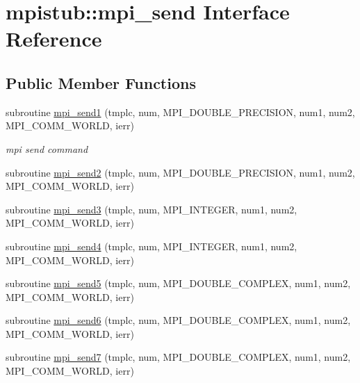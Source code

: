 \hypertarget{interfacempistub_1_1mpi__send}{}\section{mpistub\+::mpi\+\_\+send Interface Reference}
\label{interfacempistub_1_1mpi__send}
\subsection*{Public Member Functions}
\begin{DoxyCompactItemize}
\item 
subroutine \mbox{\hyperlink{interfacempistub_1_1mpi__send_af2fa871f29ad9623f189a5f4cfc90bc9}{mpi\+\_\+send1}} (tmplc, num, M\+P\+I\+\_\+\+D\+O\+U\+B\+L\+E\+\_\+\+P\+R\+E\+C\+I\+S\+I\+ON, num1, num2, M\+P\+I\+\_\+\+C\+O\+M\+M\+\_\+\+W\+O\+R\+LD, ierr)
\begin{DoxyCompactList}\small\item\em mpi send command \end{DoxyCompactList}\item 
subroutine \mbox{\hyperlink{interfacempistub_1_1mpi__send_a10cc2a781be157fda194cda05bb83748}{mpi\+\_\+send2}} (tmplc, num, M\+P\+I\+\_\+\+D\+O\+U\+B\+L\+E\+\_\+\+P\+R\+E\+C\+I\+S\+I\+ON, num1, num2, M\+P\+I\+\_\+\+C\+O\+M\+M\+\_\+\+W\+O\+R\+LD, ierr)
\item 
subroutine \mbox{\hyperlink{interfacempistub_1_1mpi__send_a1fd59b40e487b8d88cbbca553b5981b7}{mpi\+\_\+send3}} (tmplc, num, M\+P\+I\+\_\+\+I\+N\+T\+E\+G\+ER, num1, num2, M\+P\+I\+\_\+\+C\+O\+M\+M\+\_\+\+W\+O\+R\+LD, ierr)
\item 
subroutine \mbox{\hyperlink{interfacempistub_1_1mpi__send_a51f8aecc0de5acab683eddaa6d15f99b}{mpi\+\_\+send4}} (tmplc, num, M\+P\+I\+\_\+\+I\+N\+T\+E\+G\+ER, num1, num2, M\+P\+I\+\_\+\+C\+O\+M\+M\+\_\+\+W\+O\+R\+LD, ierr)
\item 
subroutine \mbox{\hyperlink{interfacempistub_1_1mpi__send_acb645abdc008dfd58ca4d0d3590f034d}{mpi\+\_\+send5}} (tmplc, num, M\+P\+I\+\_\+\+D\+O\+U\+B\+L\+E\+\_\+\+C\+O\+M\+P\+L\+EX, num1, num2, M\+P\+I\+\_\+\+C\+O\+M\+M\+\_\+\+W\+O\+R\+LD, ierr)
\item 
subroutine \mbox{\hyperlink{interfacempistub_1_1mpi__send_ab4b6754f184fdfba39035e14d819510e}{mpi\+\_\+send6}} (tmplc, num, M\+P\+I\+\_\+\+D\+O\+U\+B\+L\+E\+\_\+\+C\+O\+M\+P\+L\+EX, num1, num2, M\+P\+I\+\_\+\+C\+O\+M\+M\+\_\+\+W\+O\+R\+LD, ierr)
\item 
subroutine \mbox{\hyperlink{interfacempistub_1_1mpi__send_a544f3d0865c606cfa68936472e684587}{mpi\+\_\+send7}} (tmplc, num, M\+P\+I\+\_\+\+D\+O\+U\+B\+L\+E\+\_\+\+C\+O\+M\+P\+L\+EX, num1, num2, M\+P\+I\+\_\+\+C\+O\+M\+M\+\_\+\+W\+O\+R\+LD, ierr)
\end{DoxyCompactItemize}


